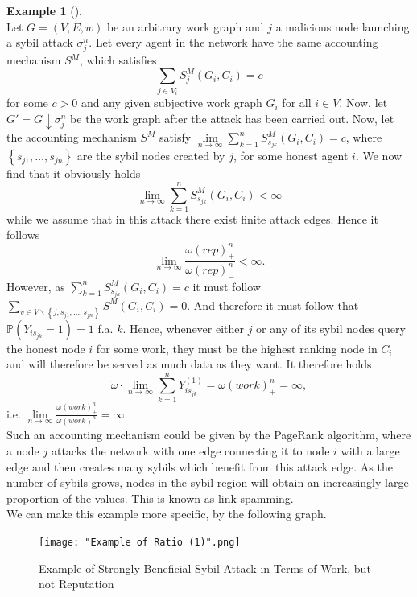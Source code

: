 \documentclass[11pt,a4paper]{report}
\theoremstyle{definition}
\theoremstyle{theorem}
\theoremstyle{proposition}
\theoremstyle{corollary}
\theoremstyle{lemma}
\theoremstyle{example}
\newtheorem{example}{Example}[section]
\theoremstyle{remark}
\begin{document}
\begin{example}[]\ \\
Let $G=(V,E,w)$ be an arbitrary work graph and $j$ a malicious node launching a sybil attack $\sigma^n_j$. Let every agent in the network have the same accounting mechanism $S^M$, which satisfies 
\[
\sum\limits_{j\in{}V_i}S^M_j(G_i,C_i)=c
\]
for some $c>0$ and any given subjective work graph $G_i$ for all $i\in{}V$. Now, let $G'=G\downarrow\sigma^n_j$ be the work graph after the attack has been carried out. Now, let the accounting mechanism $S^M$ satisfy $\lim\limits_{n\rightarrow\infty}\sum\limits_{k=1}^{n}S^M_{s_{jk}}(G_i,C_i)=c$, where $\left\lbrace{}s_{j1},\ldots,s_{jn}\right\rbrace$ are the sybil nodes created by $j$, for some honest agent $i$. We now find that it obviously holds
\[
\lim\limits_{n\rightarrow\infty}\sum\limits_{k=1}^{n}S^M_{s_{jk}}(G_i,C_i)<\infty
\]
while we assume that in this attack there exist finite attack edges. Hence it follows
\[
\lim\limits_{n\rightarrow\infty}\frac{\omega(rep)^n_{+}}{\omega(rep)^n_{-}}<\infty.
\]
However, as $\sum\limits_{k=1}^{n}S^M_{s_{jk}}(G_i,C_i)=c$ it must follow $\sum\limits_{v\in{}V\backslash{}\left\lbrace{}j,s_{j1},\ldots,s_{jn}\right\rbrace}S^M_{}(G_i,C_i)=0$. And therefore it must follow that $\mathbb{P}(Y_{is_{jk}}=1)=1$ f.a. $k$. Hence, whenever either $j$ or any of its sybil nodes query the honest node $i$ for some work, they must be the highest ranking node in $C_i$ and will therefore be served as much data as they want. It therefore holds
\[
\tilde{\omega}\cdot{}\lim\limits_{n\rightarrow\infty}\sum\limits_{k=1}^{n}Y^{(1)}_{is_{jk}} = \omega(work)^n_{+} = \infty,
\]
i.e. $\lim\limits_{n\rightarrow\infty}\frac{\omega(work)^n_{+}}{\omega(work)^n_{-}}=\infty$. 
\vspace{1em}\\

\noindent{}Such an accounting mechanism could be given by the PageRank algorithm, where a node $j$ attacks the network with one edge connecting it to node $i$ with a large edge and then creates many sybils which benefit from this attack edge. As the number of sybils grows, nodes in the sybil region will obtain an increasingly large proportion of the values. This is known as link spamming. \vspace{1em}\\

\noindent{}We can make this example more specific, by the following graph. 

\begin{figure}[H]
\begin{center}
\texttt{[image: "Example of Ratio (1)".png]}
\caption{Example of Strongly Beneficial Sybil Attack in Terms of Work, but not Reputation}
\label{fig:Example of Strongly Beneficial Sybil Attack in Terms of Work, but not Reputation}
\end{center}
\end{figure}


\end{example}
\end{document}
